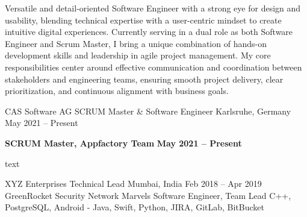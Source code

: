 \documentclass[10pt, a4paper]{cvhari}
\begin{document}

\makecvheader
\medskip



    \par
    Versatile and detail-oriented Software Engineer with a strong eye for design and usability, blending technical expertise with a user-centric mindset to create intuitive digital experiences. Currently serving in a dual role as both Software Engineer and Scrum Master, I bring a unique combination of hands-on development skills and leadership in agile project management. My core responsibilities center around effective communication and coordination between stakeholders and engineering teams, ensuring smooth project delivery, clear prioritization, and continuous alignment with business goals.
    \par
\medskip



    \company
        {CAS Software AG}
        {SCRUM Master \& Software Engineer}
        {Karlsruhe, Germany}
        {May 2021 -- Present}
    \vspace{0.5em}

    \textbf{SCRUM Master, Appfactory Team} \hfill \textbf{May 2021 -- Present}

    \vspace{0.2em}
    \par
    text
    \par
    
    

\smallskip
\divider
\smallskip

    \company
        {XYZ Enterprises}
        {Technical Lead}
        {Mumbai, India}
        {Feb 2018 – Apr 2019}
        \project
            {GreenRocket Security}
            {Network Marvels}
            {Software Engineer, Team Lead}
            {C++, PostgreSQL, Android - Java, Swift, Python, JIRA, GitLab, BitBucket}
        
\end{document}
